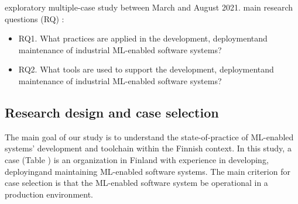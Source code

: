 \DIFdelbegin %

\DIFdelend 
\DIFaddbegin {}\DIFaddend exploratory multiple-case study \cite{Runeson2008} \DIFaddbegin {}\DIFaddend between March and August 2021. %
\DIFdelbegin {}\DIFdelend \DIFaddbegin {}\DIFaddend main research questions (RQ) \DIFdelbegin {}\DIFdelend \DIFaddbegin {}\DIFaddend :
\begin{itemize}
    \item RQ1. What practices are applied in the development, deployment\DIFaddbegin \DIFadd{, }\DIFaddend and maintenance of industrial ML-enabled software systems?
    \item RQ2. What tools are used to support the development, deployment\DIFaddbegin \DIFadd{, }\DIFaddend and maintenance of industrial ML-enabled software systems?
\end{itemize}

\subsection{Research design and case selection}
The main goal of our study is to understand the state-of-practice of ML-enabled systems' development and toolchain within the Finnish context. In this study, a case (Table  \DIFdelbegin \DIFdel{\ref{tab:data_source_storage_mlframeworks}}\DIFdelend \DIFaddbegin \DIFadd{\ref{tab:data_source_storage_mlframeworks_interviewees}}\DIFaddend ) is an organization in Finland with experience in developing, deploying\DIFaddbegin \DIFadd{, }\DIFaddend and maintaining ML-enabled software systems. The main criterion for case selection is that the ML-enabled software system \DIFdelbegin {}\DIFdelend \DIFaddbegin {}\DIFaddend be operational in a production environment.

